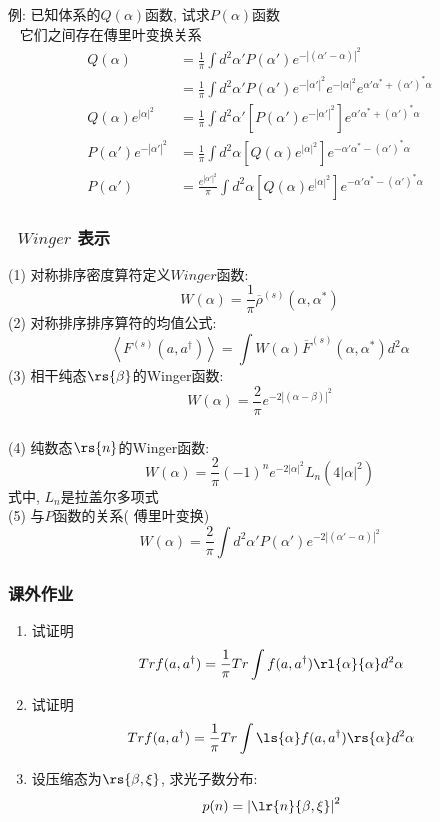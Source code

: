   \begin{frame} 
  \frametitle{}
      例: 已知体系的$Q(\alpha)$函数, 试求$P(\alpha)$函数 \\ 
      \解~ 它们之间存在傳里叶变换关系 
      \[ \begin{aligned}
        Q(\alpha) &= \frac{1}{\pi} \int  d^2 \alpha' P(\alpha') e^{-\left|(\alpha'-\alpha)\right|^2}\\
        &= \frac{1}{\pi} \int  d^2 \alpha' P(\alpha') e^{-\left|\alpha'\right|^2} e^{-\left|\alpha\right|^2} e^{\alpha'\alpha^*  +(\alpha')^* \alpha  } \\ 
        Q(\alpha)e^{\left|\alpha\right|^2} &= \frac{1}{\pi} \int  d^2 \alpha' [P(\alpha') e^{-\left|\alpha'\right|^2}]  e^{\alpha'\alpha^*  +(\alpha')^* \alpha  } \\ 
        P(\alpha') e^{-\left|\alpha'\right|^2} &= \frac{1}{\pi} \int  d^2 \alpha [Q(\alpha)e^{\left|\alpha\right|^2}]  e^{-\alpha'\alpha^*  -(\alpha')^* \alpha  } \\
        P(\alpha')  &= \frac{e^{\left|\alpha'\right|^2}}{\pi} \int  d^2 \alpha [Q(\alpha)e^{\left|\alpha\right|^2}]  e^{-\alpha'\alpha^*  -(\alpha')^* \alpha  } 
      \end{aligned}\] 
  \end{frame}

  \begin{frame} 
    \frametitle{~$Winger$ 表示}
    (1) 对称排序密度算符定义$Winger$函数:
    \[ W(\alpha) =\frac{1}{\pi} \overline{\rho}^{(s)}(\alpha, \alpha^*)\]
    (2) 对称排序排序算符的均值公式:
    \[ \left\langle F^{(s)} (a, a^{\dagger}) \right\rangle = \int W(\alpha) \overline{F}^{(s)} (\alpha, \alpha^{*}) d^2 \alpha\]
    (3) 相干纯态$\rs{\beta}$的Winger函数:
    \[ W(\alpha) = \frac{2}{\pi} e^{-2\left| (\alpha-\beta) \right|^2}\]
  \end{frame}

  \begin{frame} 
  \frametitle{}
    (4) 纯数态$\rs{n}$的Winger函数:
    \[ W(\alpha) = \frac{2}{\pi} (-1)^n e^{-2\left| \alpha\right|^2} L_n(4\left|\alpha\right|^2)\]
    式中, $L_n$是拉盖尔多项式 \\ {\vspace*{0.3em}}
    (5) 与$P$函数的关系( 傅里叶变换)
    \[W(\alpha) = \frac{2}{\pi} \int  d^2 \alpha' P(\alpha') e^{-2\left|(\alpha'-\alpha)\right|^2}\]
  \end{frame}

   \begin{frame} 
       \frametitle{课外作业}
       \begin{enumerate}
           \item 试证明  \[Tr f(a, a^{\dagger}) = \frac{1}{\pi}Tr \int f(a, a^{\dagger}) \rl{\alpha}{\alpha} d^2 \alpha\]
           \item 试证明  \[Tr f(a, a^{\dagger}) = \frac{1}{\pi}Tr \int \ls{\alpha} f(a, a^{\dagger}) \rs{\alpha} d^2 \alpha\]
           \item 设压缩态为$\rs{\beta,\xi}$, 求光子数分布:
           \[ p(n) = \left| \lr{n}{\beta,\xi} \right|^2\]
       \end{enumerate}
   \end{frame}
